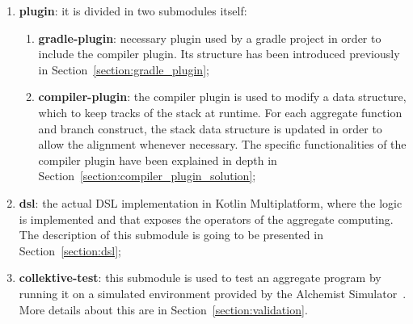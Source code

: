 \begin{enumerate}
    \item \textbf{plugin}: it is divided in two submodules itself: 
    \begin{enumerate}
        \item \textbf{gradle-plugin}: necessary plugin used by a gradle project in order to include the compiler plugin. Its structure has been introduced previously in Section~\ref{section:gradle_plugin};
        \item \textbf{compiler-plugin}: the compiler plugin is used to modify a data structure, which to keep tracks of the stack at runtime. For each aggregate function and branch construct, the stack data structure is updated in order to allow the alignment whenever necessary. The specific functionalities of the compiler plugin have been explained in depth in Section~\ref{section:compiler_plugin_solution}; 
    \end{enumerate}
    \item \textbf{dsl}: the actual DSL implementation in Kotlin Multiplatform, where the logic is implemented and that exposes the operators of the aggregate computing. The description of this submodule is going to be presented in Section~\ref{section:dsl};
    \item \textbf{collektive-test}: this submodule is used to test an aggregate program by running it on a simulated environment provided by the Alchemist Simulator~\cite{alchemist}. More details about this are in Section~\ref{section:validation}.
\end{enumerate}

